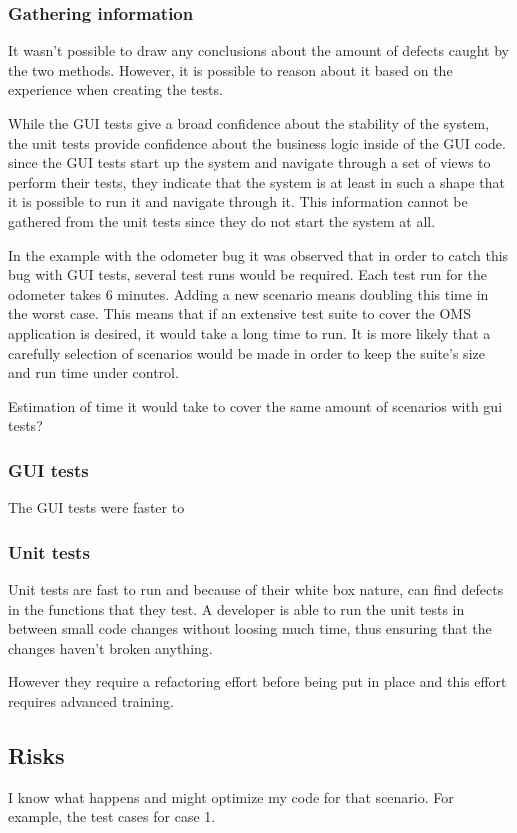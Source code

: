 \documentclass{article}
\begin{document}
			\subsubsection{Gathering information}
			It wasn't possible to draw any conclusions about the amount of defects caught by the two methods. However, it is possible to reason about it based on the experience when creating the tests. 

			While the GUI tests give a broad confidence about the stability of the system, the unit tests provide confidence about the business logic inside of the GUI code. since the GUI tests start up the system and navigate through a set of views to perform their tests, they indicate that the system is at least in such a shape that it is possible to run it and navigate through it. This information cannot be gathered from the unit tests since they do not start the system at all. 

			In the example with the odometer bug it was observed that in order to catch this bug with GUI tests, several test runs would be required. Each test run for the odometer takes 6 minutes. Adding a new scenario means doubling this time in the worst case. This means that if an extensive test suite to cover the OMS application is desired, it would take a long time to run. It is more likely that a carefully selection of scenarios would be made in order to keep the suite's size and run time under control.  
			
			Estimation of time it would take to cover the same amount of scenarios with gui tests?

			\subsubsection{GUI tests}
			The GUI tests were faster to 

			\subsubsection{Unit tests}
			Unit tests are fast to run and because of their white box nature, can find defects in the functions that they test. A developer is able to run the unit tests in between small code changes without loosing much time, thus ensuring that the changes haven't broken anything. 

			However they require a refactoring effort before being put in place and this effort requires advanced training. 

		\subsection{Risks}
		I know what happens and might optimize my code for that scenario. For example, the test cases for case 1. 
\end{document}
